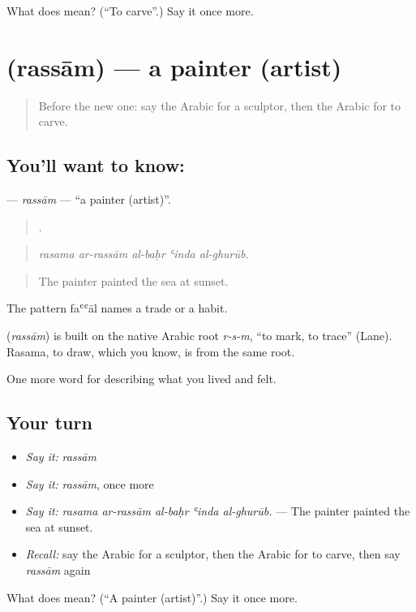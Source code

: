 \begin{tcolorbox}[breakable,colback=teal!4,colframe=teal!35!black,title={Before you move on}]
What does  mean? (\textquotedblleft{}To carve\textquotedblright{}.) Say it once more.
\end{tcolorbox}
\section[\texorpdfstring{\ar{رسام} (rassām)}{رسام (rassām)}]{ (rassām) — a painter (artist)}

\label{lesson:AR-C541-rassam}



\begin{quote}
Before the new one: say the Arabic for a sculptor, then the Arabic for to carve.
\end{quote}

\subsection*{You'll want to know: }
\textbf{} — \emph{rassām} — \textquotedblleft{}a painter (artist)\textquotedblright{}.

\begin{quote}
    .
\end{quote}

\begin{quote}
\emph{rasama ar-rassām al-baḥr ʿinda al-ghurūb.}
\end{quote}

\begin{quote}
The painter painted the sea at sunset.
\end{quote}

The pattern faʿʿāl names a trade or a habit.

\begin{cousinweb}
\textbf{} (\emph{rassām}) is built on the native Arabic root \emph{r-s-m}, \textquotedblleft{}to mark, to trace\textquotedblright{} (Lane). Rasama, to draw, which you know, is from the same root.
\end{cousinweb}

\begin{grammarlens}[title={What you've built}]
One more word for describing what you lived and felt.
\end{grammarlens}

\subsection*{Your turn}
\begin{itemize}
\raggedright
  \item \emph{Say it:} \emph{rassām}
  \item \emph{Say it:} \emph{rassām}, once more
  \item \emph{Say it:} \emph{rasama ar-rassām al-baḥr ʿinda al-ghurūb.} — The painter painted the sea at sunset.
  \item \emph{Recall:} say the Arabic for a sculptor, then the Arabic for to carve, then say \emph{rassām} again
\end{itemize}

\begin{tcolorbox}[breakable,colback=teal!4,colframe=teal!35!black,title={Before you move on}]
What does  mean? (\textquotedblleft{}A painter (artist)\textquotedblright{}.) Say it once more.
\end{tcolorbox}
